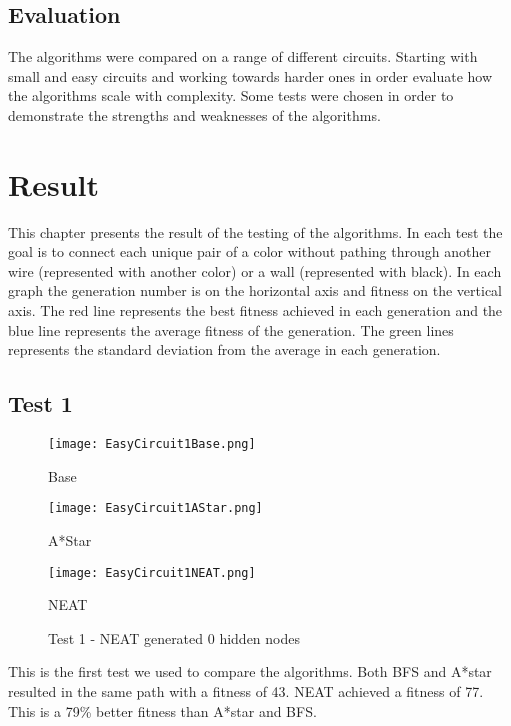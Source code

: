 \documentclass{kththesis}
\begin{document}
\section{Evaluation}
The algorithms were compared on a range of different circuits. Starting with small and easy circuits and working towards harder ones in order evaluate how the algorithms scale with complexity. Some tests were chosen in order to demonstrate the strengths and weaknesses of the algorithms.
 
\chapter{Result}
 
This chapter presents the result of the testing of the algorithms. In each test the goal is to connect each unique pair of a color without pathing through another wire (represented with another color) or a wall (represented with black). In each graph the generation number is on the horizontal axis and fitness on the vertical axis. The red line represents the best fitness achieved in each generation and the blue line represents the average fitness of the generation. The green lines represents the standard deviation from the average in each generation.
 
\section{Test 1}
 
\begin{figure}[h]
{\centering
 
\begin{minipage}{0.3\textwidth}
\centering
\texttt{[image: EasyCircuit1Base.png]}
\caption{Base}
\end{minipage}\hfill
\begin{minipage}{0.3\textwidth}
\centering
\texttt{[image: EasyCircuit1AStar.png]}
\caption{A*Star}
\end{minipage}\hfill
\begin{minipage}{0.3\textwidth}
\centering
\texttt{[image: EasyCircuit1NEAT.png]}
\caption{NEAT}
\end{minipage}\hfill
\caption{Test 1 - NEAT generated 0 hidden nodes}
\label{Test 1}
}
 
\end{figure}
 
This is the first test we used to compare the algorithms. Both BFS and A*star resulted in the same path with a fitness of 43. NEAT achieved a fitness of 77. This is a 79\% better fitness than A*star and BFS.
 
\end{document}
